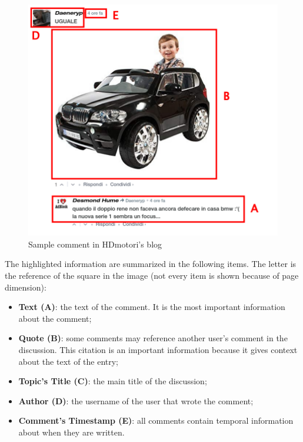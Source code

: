 \begin{figure}[!h]
	\centering
	\includegraphics[width=1\textwidth]{figures/screen/screen-hdmotori.png}
	\caption{Sample comment in HDmotori's blog}
	\label{fig:screen-hdmotori}
\end{figure}

The highlighted information are summarized in the following items. The letter is the reference of the square in the image (not every item is shown because of page dimension):

\begin{itemize}
	\item \textbf{Text (A)}: the text of the comment. It is the most important information about the comment;
	
	\item \textbf{Quote (B)}: some comments may reference another user's comment in the discussion. This citation is an important information because it gives context about the text of the entry;
	
	\item \textbf{Topic's Title (C)}: the main title of the discussion;
	
	\item \textbf{Author (D)}: the username of the user that wrote the comment;
	
	\item \textbf{Comment's Timestamp (E)}: all comments contain temporal information about when they are written.
\end{itemize}


